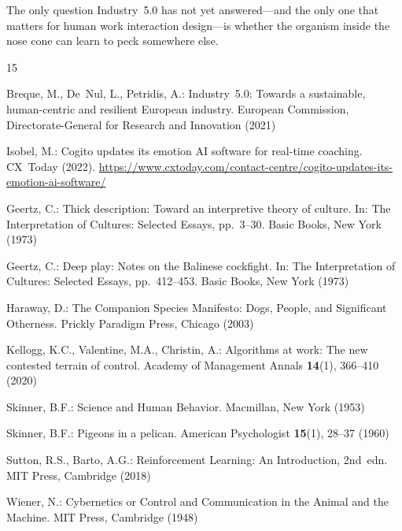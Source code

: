 \documentclass[runningheads]{llncs}
\begin{document}
The only question Industry~5.0 has not yet answered---and the only one that
matters for human work interaction design---is whether the organism inside the
nose cone can learn to peck somewhere else.


\begin{thebibliography}{15}

Breque, M., De~Nul, L., Petridis, A.: Industry~5.0: Towards a sustainable,
human-centric and resilient European industry. European Commission,
Directorate-General for Research and Innovation (2021)

Isobel, M.: Cogito updates its emotion AI software for real-time coaching.
CX~Today (2022). \url{https://www.cxtoday.com/contact-centre/cogito-updates-its-emotion-ai-software/}

Geertz, C.: Thick description: Toward an interpretive theory of culture.
In: The Interpretation of Cultures: Selected Essays, pp.~3--30.
Basic Books, New York (1973)

Geertz, C.: Deep play: Notes on the Balinese cockfight.
In: The Interpretation of Cultures: Selected Essays, pp.~412--453.
Basic Books, New York (1973)

Haraway, D.: The Companion Species Manifesto: Dogs, People, and Significant
Otherness. Prickly Paradigm Press, Chicago (2003)

Kellogg, K.C., Valentine, M.A., Christin, A.: Algorithms at work: The new
contested terrain of control. Academy of Management Annals \textbf{14}(1),
366--410 (2020)

Skinner, B.F.: Science and Human Behavior. Macmillan, New York (1953)

Skinner, B.F.: Pigeons in a pelican. American Psychologist
\textbf{15}(1), 28--37 (1960)

Sutton, R.S., Barto, A.G.: Reinforcement Learning: An Introduction, 2nd~edn.
MIT Press, Cambridge (2018)

Wiener, N.: Cybernetics or Control and Communication in the Animal and the
Machine. MIT Press, Cambridge (1948)


\end{thebibliography}
\end{document}
